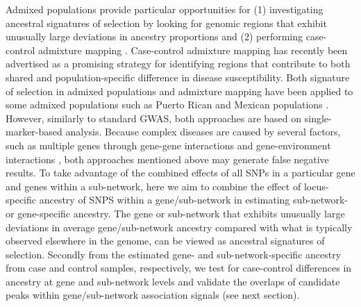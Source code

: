 \documentclass[10pt]{article}
\begin{document}
Admixed populations provide particular opportunities for (1) investigating ancestral signatures of selection by looking for genomic regions that exhibit unusually large deviations in ancestry proportions and (2) performing case-control admixture mapping \cite{tang2,monta}. Case-control admixture mapping has recently been advertised as a promising strategy for identifying regions that contribute to both shared and population-specific difference in disease susceptibility. Both signature of selection in admixed populations and admixture mapping have been applied to some admixed populations such as Puerto Rican and Mexican populations \cite{tang2,dara}. However, similarly to standard GWAS, both approaches are based on single-marker-based analysis. Because complex diseases are caused by several factors, such as multiple genes through gene-gene interactions and gene-environment interactions \cite{wum,wuka,wuhr,wu3,wu4,wu5,wu6}, both approaches mentioned  above may generate false negative results. To take advantage of the combined effects of all SNPs in a particular gene and genes within a sub-network, here we aim to combine the effect of locus-specific ancestry of SNPS within a gene/sub-network in estimating sub-network- or gene-specific ancestry. The gene or sub-network that exhibits unusually large deviations in average gene/sub-network ancestry compared with what is typically observed elsewhere in the genome, can be viewed as ancestral signatures of selection. Secondly from the estimated gene- and sub-network-specific ancestry from case and control samples, respectively, we test for case-control differences in ancestry at gene and sub-network levels and validate the overlaps of candidate peaks within gene/sub-network association signals (see next section). 
\end{document}
